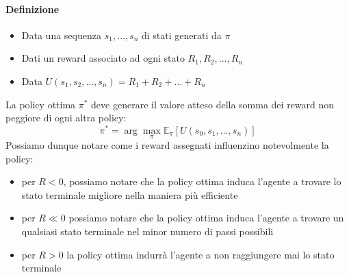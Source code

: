 \paragraph{Definizione}
\begin{itemize}
    \item Data una sequenza $s_1,\dots, s_n$ di stati generati da $\pi$
    \item Dati un reward associato ad ogni stato $R_1,R_2,\dots, R_n$
    \item Data $U(s_1,s_2,\dots,s_n) = R_1 + R_2 + \dots + R_n$
\end{itemize} 
La policy ottima $\pi^*$  deve generare il valore atteso della somma dei reward non peggiore di ogni altra policy:
\begin{equation}
    \pi^* = \arg \max_{\pi} \mathbb{E}_{\pi}\left[ U(s_0,s_1, \dots, s_n)\right]
\end{equation}
Possiamo dunque notare come i reward assegnati influenzino notevolmente la policy:
\begin{itemize}
    \item per $R < 0$, possiamo notare che la policy ottima induca l'agente a trovare lo stato terminale migliore nella maniera più efficiente
    \item per $R \ll 0$ possiamo notare che la policy ottima induca l'agente a trovare un qualsiasi stato terminale nel minor numero di passi possibili
    \item per $R > 0$ la policy ottima indurrà l'agente a non raggiungere mai lo stato terminale  
\end{itemize}